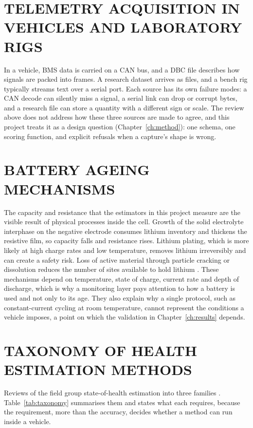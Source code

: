 \documentclass[12pt,a4paper]{amritareport}
\begin{document}
\section{TELEMETRY ACQUISITION IN VEHICLES AND LABORATORY RIGS}

In a vehicle, BMS data is carried on a CAN bus, and a DBC file describes how signals are packed into frames. A research dataset arrives as files, and a bench rig typically streams text over a serial port. Each source has its own failure modes: a CAN decode can silently miss a signal, a serial link can drop or corrupt bytes, and a research file can store a quantity with a different sign or scale. The review above does not address how these three sources are made to agree, and this project treats it as a design question (Chapter~\ref{ch:method}): one schema, one scoring function, and explicit refusals when a capture's shape is wrong.

\section{BATTERY AGEING MECHANISMS}

The capacity and resistance that the estimators in this project measure are the visible result of physical processes inside the cell. Growth of the solid electrolyte interphase on the negative electrode consumes lithium inventory and thickens the resistive film, so capacity falls and resistance rises. Lithium plating, which is more likely at high charge rates and low temperature, removes lithium irreversibly and can create a safety risk. Loss of active material through particle cracking or dissolution reduces the number of sites available to hold lithium \cite{vetter2005,barre2013}. These mechanisms depend on temperature, state of charge, current rate and depth of discharge, which is why a monitoring layer pays attention to how a battery is used and not only to its age. They also explain why a single protocol, such as constant-current cycling at room temperature, cannot represent the conditions a vehicle imposes, a point on which the validation in Chapter~\ref{ch:results} depends.

\section{TAXONOMY OF HEALTH ESTIMATION METHODS}

Reviews of the field group state-of-health estimation into three families \cite{berecibar2016,waag2014}. Table~\ref{tab:taxonomy} summarises them and states what each requires, because the requirement, more than the accuracy, decides whether a method can run inside a vehicle.
\end{document}
